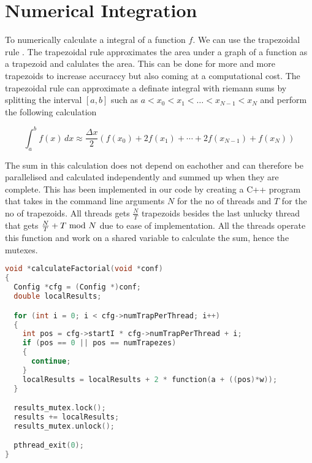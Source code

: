 \section{Numerical Integration}

To numerically calculate a integral of a function $f$. We can
use the trapezoidal rule \cite{trapezoidal}. The trapezoidal rule 
approximates the area under a graph of a function as a trapezoid and 
calulates the area. This can be done for more and more trapezoids to increase
accuraccy but also coming at a computational cost. The trapezoidal rule can 
approximate a definate integral with riemann sums by splitting the interval 
$[a, b]$ such as $a < x_0 < x_1 < \dots < x_{N-1} < x_N$ and perform the 
following calculation

\begin{equation}
    \int_a^b f(x) \, dx \approx \frac{\Delta x}{2} \left(f(x_0) + 2f(x_1) + \cdots + 2f(x_{N-1}) + f(x_N)\right)
\end{equation}

The sum in this calculation does not depend on eachother and can therefore be
parallelised and calculated independently and summed up when they are complete.
This has been implemented in our code by creating a C++ program that takes in
the command line arguments $N$ for the no of threads and $T$ for the no of
trapezoids. All threads gets $\frac{N}{T}$ trapezoids besides the last unlucky
thread that gets $\frac{N}{T} + T \ \mathrm{mod}\ N$ due to ease of implementation. All
the threads operate this function and work on a shared variable to calculate 
the sum, hence the mutexes.

\begin{lstlisting}[language=C++, caption=non-determinism.cpp]
void *calculateFactorial(void *conf)
{
  Config *cfg = (Config *)conf;
  double localResults;

  for (int i = 0; i < cfg->numTrapPerThread; i++)
  {
    int pos = cfg->startI * cfg->numTrapPerThread + i;
    if (pos == 0 || pos == numTrapezes)
    {
      continue;
    }
    localResults = localResults + 2 * function(a + ((pos)*w));
  }

  results_mutex.lock();
  results += localResults;
  results_mutex.unlock();

  pthread_exit(0);
}
\end{lstlisting}

